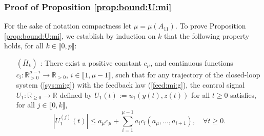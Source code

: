 \documentclass[letterpaper, 10pt]{article}
\newcommand{\rref}[1]{(\ref{#1})}
\newcommand{\abs}[1]{\left| #1 \right|}
\newcommand{\reels}{\mathbb{R}}
\begin{document}
\subsubsection{Proof of Proposition \ref{prop:bound:U:mi}}
\label{sss:Pr:3}
For the sake of notation compactness let $\mu = \mu(A_{11})$. To prove Proposition \ref{prop:bound:U:mi}, we establish by induction on $k$ that the following property holds, for all $k \in \llbracket 0,p \rrbracket$:
\begin{itemize}
\item[$(\overline{H}_k)$ :]There exist a positive constant $c_\mu$, and continuous functions $c_i : \reels^{\mu -i}_{>0 } \to \reels_{>0} $, $i \in \llbracket 1 , \mu -1 \rrbracket$, such that for any trajectory of the closed-loop system \rref{sys:mi:g} with the feedback law \rref{feed:mi:g}, the control signal $U_1 : \reels_{\geq 0} \rightarrow  \reels $ defined by $U_1(t) := u_1 (y(t),z(t)) $ for all $t \geq 0$ satisfies, for all $j \in \llbracket 0 ,k \rrbracket $,
\begin{equation*}
\abs{ U_1^{(j)}(t)} \leq a_\mu c_{\mu}+ \sum\limits_{i=1}^{ \mu - 1 } a_i c_i( a_{\mu} , \ldots , a_{i+1} ), \quad \forall t \geq 0. 
\end{equation*}
\end{itemize}
\end{document}
